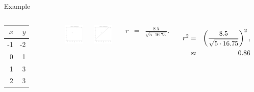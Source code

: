 \begin{frame}{Example}
  
  \begin{columns}
    \begin{tabular}{r|r}
      $x$ & $y$ \\ \hline
      -1 & -2 \\
      0 & 1 \\
      1 & 3 \\
      2 & 3
    \end{tabular}


    
    {
      \centerline{\includegraphics[width=5cm]{img/week2-Day3-Regression1}}
    }

    {
      \centerline{\includegraphics[width=5cm]{img/week2-Day3-Regression2}}
    }

    {
      \begin{eqnarray*}
        r & = & \frac{8.5}{\sqrt{5\cdot 16.75}}.
      \end{eqnarray*}
    }

    {
      \begin{eqnarray*}
        r^2 & = & \left(\frac{8.5}{\sqrt{5\cdot 16.75}}\right)^2, \\
          & \approx & 0.86
      \end{eqnarray*}
    }



    \end{columns}

\end{frame}



